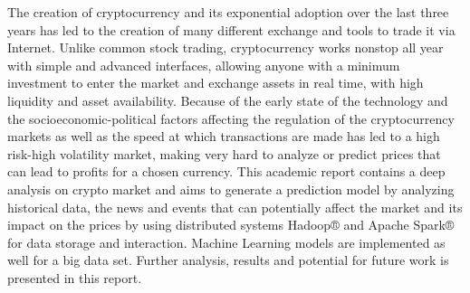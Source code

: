 The creation of cryptocurrency and its exponential adoption over the last three years  has led to the creation of many different exchange and tools to trade it via Internet. Unlike common stock trading, cryptocurrency works nonstop all year with simple and advanced interfaces, allowing anyone with a minimum investment to enter the market and exchange assets in real time, with high liquidity and asset availability. Because of the early state of the technology and the socioeconomic-political factors affecting the regulation of the cryptocurrency markets as well as the speed at which transactions are made has led to a high risk-high volatility market, making very hard to analyze or predict prices that can lead to profits for a chosen currency. This academic report contains a deep analysis on crypto market and aims to generate a prediction model by analyzing historical data, the news and events that can potentially affect the market and its impact on the prices by using distributed systems Hadoop® and Apache Spark® for data storage and interaction. Machine Learning models are implemented as well for a big data set. Further analysis, results and potential for future work is presented in this report.